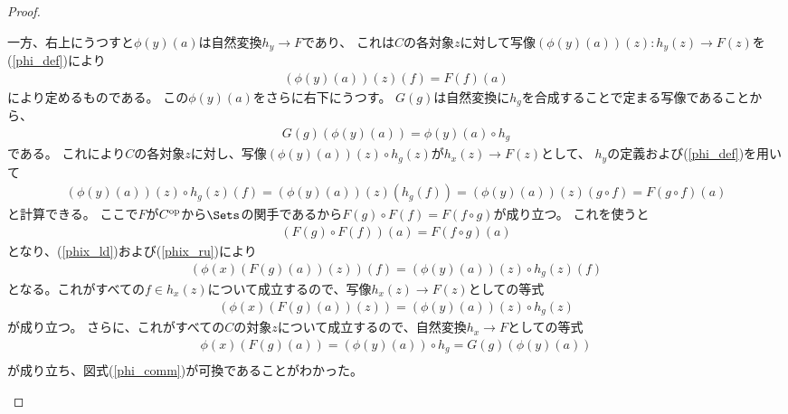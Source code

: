 \documentclass[uplatex]{jsarticle}
\begin{document}
\begin{proof}
\begin{enumerate}
\begin{enumerate}
一方、右上にうつすと$\phi(y)(a)$は自然変換$h_y \to F$であり、
これは$C$の各対象$z$に対して写像$(\phi(y)(a))(z):h_y(z) \to F(z)$を(\ref{phi_def})により
\begin{align*}
(\phi(y)(a))(z)(f)=F(f)(a)
\end{align*}
により定めるものである。
この$\phi(y)(a)$をさらに右下にうつす。
$G(g)$は自然変換に$h_g$を合成することで定まる写像であることから、
\begin{align*}
G(g)(\phi(y)(a))=\phi(y)(a)\circ h_g
\end{align*}
である。
これにより$C$の各対象$z$に対し、写像$(\phi(y)(a))(z)\circ h_g(z)$が$h_x(z) \to  F(z)$として、
$h_y$の定義および(\ref{phi_def})を用いて
\begin{align}\label{phix_ru}
(\phi(y)(a))(z)\circ h_g(z)(f) = (\phi(y)(a))(z)(h_g(f))=(\phi(y)(a))(z)(g\circ f)=F(g\circ f)(a)
\end{align}
と計算できる。
ここで$F$が$C^{\rm op}$から$\Sets$の関手であるから$F(g)\circ F(f)=F(f \circ g)$が成り立つ。
これを使うと
\begin{align*}
(F(g)\circ F(f))(a)=F(f \circ g)(a)
\end{align*}
となり、(\ref{phix_ld})および(\ref{phix_ru})により
\begin{align*}
(\phi(x)(F(g)(a))(z))(f)=(\phi(y)(a))(z)\circ h_g(z)(f)
\end{align*}
となる。これがすべての$f\in h_x(z)$について成立するので、写像$h_x(z) \to F(z)$としての等式
\begin{align*}
(\phi(x)(F(g)(a))(z))=(\phi(y)(a))(z)\circ h_g(z)
\end{align*}
が成り立つ。
さらに、これがすべての$C$の対象$z$について成立するので、自然変換$h_x \to F$としての等式
\begin{align*}
\phi(x)(F(g)(a))=(\phi(y)(a))\circ h_g=G(g)(\phi(y)(a))\\
\end{align*}
が成り立ち、図式(\ref{phi_comm})が可換であることがわかった。
\end{enumerate}


\end{enumerate}
\end{proof}
\end{document}
